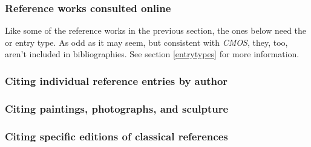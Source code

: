 \documentclass[11pt,letterpaper,oneside]{article}
\begin{document}
\subsubsection{Reference works consulted online}
\label{14.233}

Like some of the reference works in the previous section, the ones
below need the  or  entry
type. As odd as it may seem, but consistent with \textit{CMOS}, they,
too, aren't included in bibliographies. See section \ref{entrytypes}
for more information.

\begin{citenobib}
\item \cite{toscanini2016}
\item \cite{cairns2016}
\item \cite{wikipedia2016}
\item \cite{merriam2016}
\end{citenobib}

\subsubsection{Citing individual reference entries by author}

\begin{citebib}
\item \cite{isaacson2005}
\end{citebib}

\subsubsection{Citing paintings, photographs, and sculpture}

\begin{citebib}
\item \cite{dali1931}
\item \cite{mccurry1984}
\item \cite{picasso1942}
\end{citebib}

\setcounter{subsubsection}{245}
\subsubsection{Citing specific editions of classical references}
\end{document}
